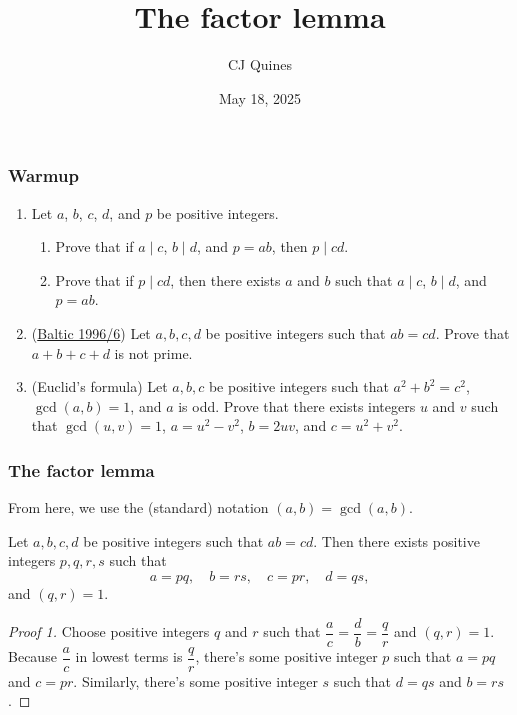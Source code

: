 \documentclass[11pt,paper=letter]{scrartcl}
\begin{document}
\title{The factor lemma}
\author{CJ Quines}
\date{May 18, 2025}

\maketitle

\subsubsection*{Warmup}

\begin{enumerate}
\item Let $a$, $b$, $c$, $d$, and $p$ be positive integers.
\begin{enumerate}
  \item Prove that if $a \mid c$, $b \mid d$, and $p = ab$, then $p \mid cd$.
  \item Prove that if $p \mid cd$, then there exists $a$ and $b$ such that $a \mid c$, $b \mid d$, and $p = ab$.
\end{enumerate}

\item (\href{https://artofproblemsolving.com/community/c6h220674p1223920}{Baltic 1996/6}) Let $a,b,c, d$ be positive integers such that $ab=cd$. Prove that $a+b+c+d$ is not prime.

\item (Euclid's formula) Let $a,b,c$ be positive integers such that $a^2 + b^2 = c^2$, $\gcd(a, b) = 1$, and $a$ is odd. Prove that there exists integers $u$ and $v$ such that $\gcd(u, v) = 1$, $a = u^2 - v^2$, $b = 2uv$, and $c = u^2 + v^2$.
\end{enumerate}

\subsubsection*{The factor lemma}

From here, we use the (standard) notation $(a, b) = \gcd(a, b)$.

\begin{lemma*}
  Let $a, b, c, d$ be positive integers such that $ab = cd$. Then there exists positive integers $p, q, r, s$ such that \[
    a = pq,\quad b = rs,\quad c = pr,\quad d = qs,
  \]
  and $(q, r) = 1$.
\end{lemma*}

\begin{proof}[Proof 1]
  Choose positive integers $q$ and $r$ such that $ \dfrac{a}{c} = \dfrac{d}{b} = \dfrac{q}{r} $ and $(q, r) = 1$. Because $ \dfrac{a}{c} $ in lowest terms is $ \dfrac{q}{r} $, there's some positive integer $p$ such that $a = pq$ and $c = pr$. Similarly, there's some positive integer $s$ such that $d = qs$ and $b = rs$.
\end{proof}
\end{document}
